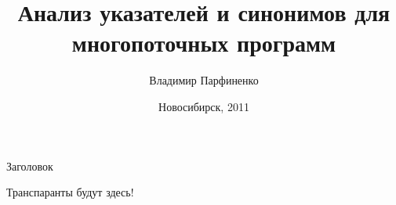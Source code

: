 \documentclass[usenames,dvipsnames,pdftex]{beamer}
\title[Анализ указателей для многопоточных программ]{
  Анализ указателей и синонимов для многопоточных программ
}
\author{
  Владимир Парфиненко
}
\institute{
  Новосибирский Государственный Университет
}
\date{
  Новосибирск, 2011
}
\begin{document}
\begin{frame}
  \titlepage
\end{frame}

\begin{frame}{Заголовок}

  Транспаранты будут здесь!

\end{frame}
\end{document}
